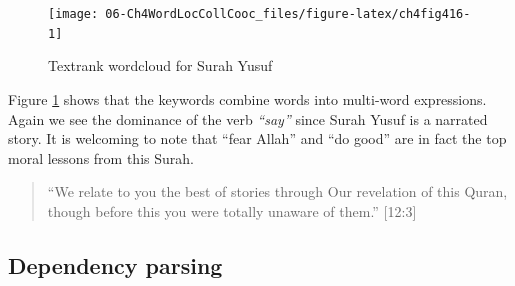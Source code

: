 \documentclass[
]{article}
\newenvironment{Shaded}{\begin{snugshade}}{\end{snugshade}}
\newcommand{\AttributeTok}[1]{\textcolor[rgb]{0.13,0.29,0.53}{#1}}
\newcommand{\DecValTok}[1]{\textcolor[rgb]{0.00,0.00,0.81}{#1}}
\newcommand{\FunctionTok}[1]{\textcolor[rgb]{0.13,0.29,0.53}{\textbf{#1}}}
\newcommand{\NormalTok}[1]{#1}
\newcommand{\OtherTok}[1]{\textcolor[rgb]{0.56,0.35,0.01}{#1}}
\newcommand{\SpecialCharTok}[1]{\textcolor[rgb]{0.81,0.36,0.00}{\textbf{#1}}}
\newcommand{\StringTok}[1]{\textcolor[rgb]{0.31,0.60,0.02}{#1}}
\begin{document}
\footnotesize

\begin{Shaded}
\end{Shaded}

\normalsize

\begin{figure}

{\centering \texttt{[image: 06-Ch4WordLocCollCooc\_files/figure-latex/ch4fig416-1]} 

}

\caption{Textrank wordcloud for Surah Yusuf}\label{fig:ch4fig416}
\end{figure}

Figure \ref{fig:ch4fig416} shows that the keywords combine words into multi-word expressions. Again we see the dominance of the verb \emph{``say''} since Surah Yusuf is a narrated story. It is welcoming to note that ``fear Allah'' and ``do good'' are in fact the top moral lessons from this Surah.

\begin{quote}
``We relate to you the best of stories through Our revelation of this Quran, though before this you were totally unaware of them.'' {[}12:3{]}
\end{quote}

\hypertarget{dependency-parsing}{%
\subsection{Dependency parsing}\label{dependency-parsing}}
\end{document}
